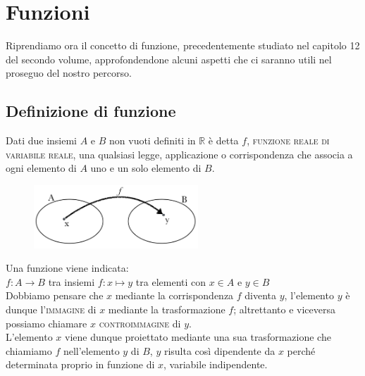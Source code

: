 

\chapter{Funzioni}

Riprendiamo ora il concetto di funzione, precedentemente studiato nel capitolo 
12 del secondo volume, approfondendone alcuni aspetti che ci saranno utili nel 
proseguo del nostro percorso.

\section{Definizione di funzione}
\begin{definizione}
  Dati due insiemi $A$ e $B$ non vuoti definiti in $\mathbb{R}$ è detta 
$f$, \textsc{funzione reale di variabile reale}, una qualsiasi legge, 
applicazione o corrispondenza che associa a ogni elemento di $A$ uno e un 
solo elemento di $B$.
\end{definizione}

\begin{figure}[htpb!]
  \centering
  \includegraphics[width=0.55\textwidth]{img/1_funz.png}
\end{figure}

Una funzione viene indicata:\\

$f: A\to B  $  tra insiemi   $f: x\mapsto y$   tra elementi  con $x\in A 
$  e $y\in B$\\

Dobbiamo pensare che $x$ mediante la corrispondenza $f$ diventa $y$, 
l'elemento $y$ è dunque l'\textsc{immagine} di $x$ mediante la trasformazione 
$f$; altrettanto e viceversa possiamo chiamare $x$ \textsc{controimmagine} di 
$y$.\\

L'elemento $x$ viene dunque proiettato mediante una sua trasformazione che 
chiamiamo $f$ nell'elemento $y$ di $B$, $y$ risulta così dipendente da $x$ 
perché determinata proprio in funzione di $x$, variabile indipendente.\\

